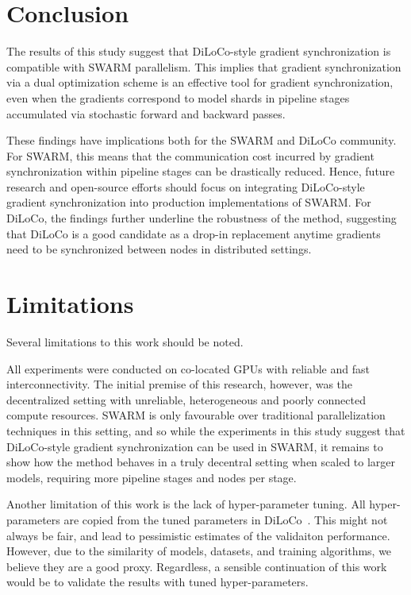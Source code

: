 \documentclass{article}
\begin{document}
\section{Conclusion}

The results of this study suggest that DiLoCo-style gradient synchronization is
compatible with SWARM parallelism. This implies that gradient 
synchronization via a dual optimization scheme is an effective tool for gradient
synchronization, even when the gradients correspond to model shards in pipeline
stages accumulated via stochastic forward and backward passes.

These findings have implications both for the SWARM and DiLoCo community. For
SWARM, this means that the communication cost incurred by gradient
synchronization within pipeline stages can be drastically reduced. Hence, future
research and open-source efforts should focus on integrating DiLoCo-style 
gradient synchronization into production implementations of SWARM. For DiLoCo,
the findings further underline the robustness of the method, suggesting that
DiLoCo is a good candidate as a drop-in replacement anytime gradients need to be
synchronized between nodes in distributed settings.

\section{Limitations}

Several limitations to this work should be noted.

All experiments were conducted on co-located GPUs with reliable and fast
interconnectivity. The initial premise of this research, however, was the
decentralized setting with unreliable, heterogeneous and poorly connected
compute resources. SWARM is only favourable over traditional parallelization
techniques in this setting, and so while the experiments in this study suggest
that DiLoCo-style gradient synchronization can be used in SWARM, it remains to
show how the method behaves in a truly decentral setting when scaled to larger
models, requiring more pipeline stages and nodes per stage.

Another limitation of this work is the lack of hyper-parameter tuning. All
hyper-parameters are copied from the tuned parameters in
DiLoCo~\cite{douillard2023diloco}. This might not always be fair, and lead to
pessimistic estimates of the validaiton performance. However, due to the
similarity of models, datasets, and training algorithms, we believe they are a
good proxy. Regardless, a sensible continuation of this work would be to
validate the results with tuned hyper-parameters.
\end{document}
